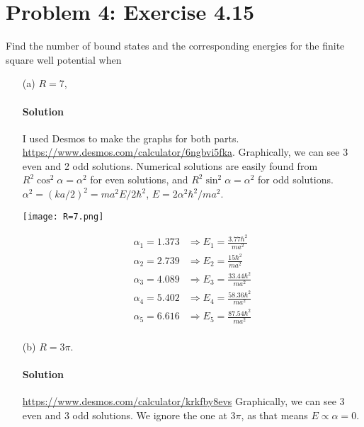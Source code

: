 \documentclass{article}
\begin{document}
\clearpage

	\section*{Problem 4: Exercise 4.15}
	
	Find the number of bound states and the corresponding energies for the finite square well potential when
	\begin{enumerate}
		\item[(a)] $R = 7$,
		\paragraph{Solution} I used Desmos to make the graphs for both parts. \href{https://www.desmos.com/calculator/6ngbvi5fka}{https://www.desmos.com/calculator/6ngbvi5fka}. Graphically, we can see 3 even and 2 odd solutions. Numerical solutions are easily found from $R^2 \cos^2 \alpha = \alpha^2$ for even solutions, and $R^2 \sin^2 \alpha = \alpha^2$ for odd solutions. $\alpha^2 = (ka/2)^2 = ma^2 E / 2\hbar^2$, $E = 2\alpha^2 \hbar^2 / ma^2$.
		
		\begin{minipage}{0.55\textwidth}
				\centering
				\texttt{[image: R=7.png]}
		\end{minipage}
		\begin{minipage}{0.35\textwidth}
			\begin{equation}
				\begin{split}
					\alpha_1 = 1.373 &\Rightarrow E_1 = \frac{3.77\hbar^2}{ma^2} \\
					\alpha_2 = 2.739 &\Rightarrow E_2 = \frac{15\hbar^2}{ma^2} \\
					\alpha_3 = 4.089 &\Rightarrow E_3 = \frac{33.44\hbar^2}{ma^2} \\
					\alpha_4 = 5.402 &\Rightarrow E_4 = \frac{58.36\hbar^2}{ma^2} \\
					\alpha_5 = 6.616 &\Rightarrow E_5 = \frac{87.54\hbar^2}{ma^2} \\
				\end{split}
			\end{equation}
		\end{minipage}		
		
		\item[(b)] $R = 3\pi$.
		\paragraph{Solution} \href{https://www.desmos.com/calculator/krkfby8evs}{https://www.desmos.com/calculator/krkfby8evs} Graphically, we can see 3 even and 3 odd solutions. We ignore the one at $3\pi$, as that means $E \propto \alpha = 0$.
		

\end{enumerate}
\end{document}
